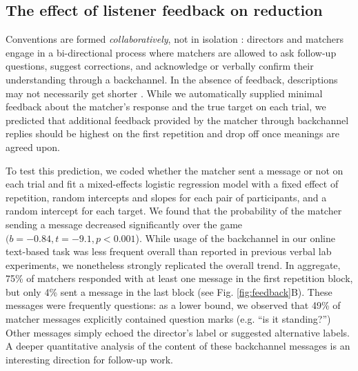 \documentclass[alpha-refs]{wiley-article}
\begin{document}
\subsection{The effect of listener feedback on reduction}\label{listener-feedback}

Conventions are formed \emph{collaboratively}, not in isolation \citep{ClarkWilkesGibbs86_ReferringCollaborative}: 
directors and matchers engage in a bi-directional process where matchers are allowed to ask follow-up questions, suggest corrections, and acknowledge or verbally confirm their understanding through a backchannel. 
In the absence of feedback, descriptions may not necessarily get shorter \citep{KraussWeinheimer66_Tangrams, GarrodFayLeeOberlanderMacLeod07_GraphicalSymbolSystems}.
While we automatically supplied minimal feedback about the matcher's response and the true target on each trial, we predicted that additional feedback provided by the matcher through backchannel replies should be highest on the first repetition and drop off once meanings are agreed upon. 

To test this prediction, we coded whether the matcher sent a message or not on each trial and fit a mixed-effects logistic regression model with a fixed effect of repetition, random intercepts and slopes for each pair of participants, and a random intercept for each target. 
We found that the probability of the matcher sending a message decreased significantly over the game $(b=-0.84, t = -9.1, p < 0.001$).
While usage of the backchannel in our online text-based task was less frequent overall than reported in previous verbal lab experiments, we nonetheless strongly replicated the overall trend.
In aggregate, 75\% of matchers responded with at least one message in the first repetition block, but only 4\% sent a message in the last block (see Fig. \ref{fig:feedback}B).
These messages were frequently questions: as a lower bound, we observed that 49\% of matcher messages explicitly contained question marks (e.g. ``is it standing?'')
Other messages simply echoed the director's label or suggested alternative labels.
A deeper quantitative analysis of the content of these backchannel messages is an interesting direction for follow-up work. 
\end{document}
